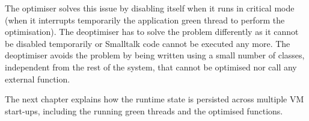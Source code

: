 \documentclass[a4paper,12pt,twoside]{../includes/ThesisStyle}
\begin{document}
The optimiser solves this issue by disabling itself when it runs in critical mode (when it interrupts temporarily the application green thread to perform the optimisation). %
The deoptimiser has to solve the problem differently as it cannot be disabled temporarily or Smalltalk code cannot be executed any more. The deoptimiser avoids the problem by being written using a small number of classes, independent from the rest of the system, that cannot be optimised nor call any external function.

The next chapter explains how the runtime state is persisted across multiple VM start-ups, including the running green threads and the optimised functions.

\ifx\wholebook\relax\else
    
\end{document}
